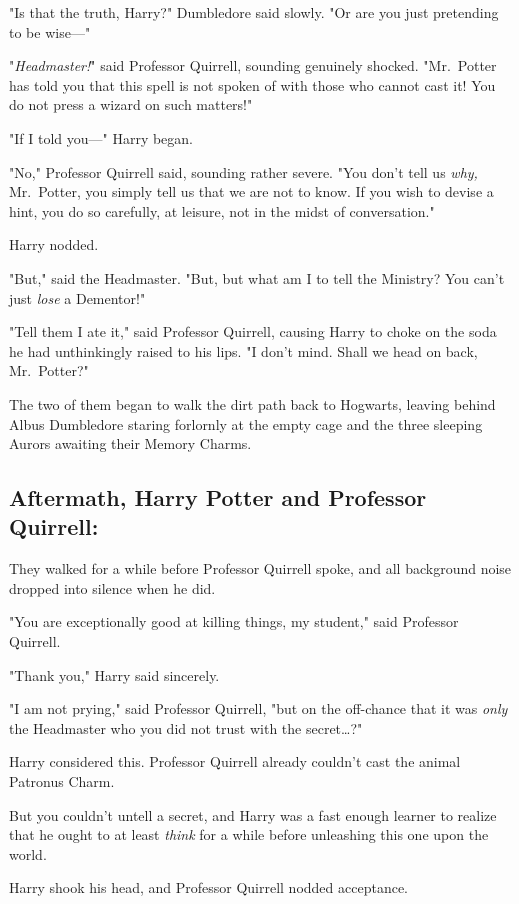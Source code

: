 "Is that the truth, Harry?" Dumbledore said slowly. "Or are you just pretending 
to be wise---"

"\emph{Headmaster!}" said Professor Quirrell, sounding genuinely shocked. 
"Mr.~Potter has told you that this spell is not spoken of with those who cannot 
cast it! You do not press a wizard on such matters!"

"If I told you---" Harry began.

"No," Professor Quirrell said, sounding rather severe. "You don't tell us 
\emph{why,} Mr.~Potter, you simply tell us that we are not to know. If you wish 
to devise a hint, you do so carefully, at leisure, not in the midst of 
conversation."

Harry nodded.

"But," said the Headmaster. "But, but what am I to tell the Ministry? You can't 
just \emph{lose} a Dementor!"

"Tell them I ate it," said Professor Quirrell, causing Harry to choke on the 
soda he had unthinkingly raised to his lips. "I don't mind. Shall we head on 
back, Mr.~Potter?"

The two of them began to walk the dirt path back to Hogwarts, leaving behind 
Albus Dumbledore staring forlornly at the empty cage and the three sleeping 
Aurors awaiting their Memory Charms.
\sbreak
\subsection{Aftermath, Harry Potter and Professor Quirrell:}

They walked for a while before Professor Quirrell spoke, and all background 
noise dropped into silence when he did.

"You are exceptionally good at killing things, my student," said Professor 
Quirrell.

"Thank you," Harry said sincerely.

"I am not prying," said Professor Quirrell, "but on the off-chance that it was 
\emph{only} the Headmaster who you did not trust with the secret{\ldots}?"

Harry considered this. Professor Quirrell already couldn't cast the animal 
Patronus Charm.

But you couldn't untell a secret, and Harry was a fast enough learner to 
realize that he ought to at least \emph{think} for a while before unleashing 
this one upon the world.

Harry shook his head, and Professor Quirrell nodded acceptance.

